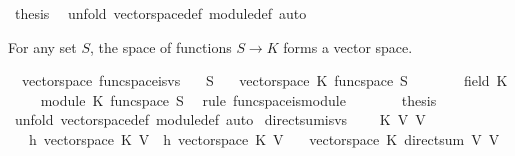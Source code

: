 \begin{isabellebody}
\ {\isacharquery}thesis\ \isamarkupfalse%
\ {\isacharparenleft}unfold\ vectorspace{\isacharunderscore}def\ module{\isacharunderscore}def{\isacharcomma}\ auto{\isacharparenright}\isanewline
{}\isamarkupfalse%
%
\endisatagproof
{\isafoldproof}%
%
\isadelimproof
%
\endisadelimproof
%
\begin{isamarkuptext}%
For any set $S$, the space of functions $S\to K$ forms a vector space.%
\end{isamarkuptext}%
\isamarkuptrue%
\isamarkupfalse%
\ {\isacharparenleft}\ vectorspace{\isacharparenright}\ func{\isacharunderscore}space{\isacharunderscore}is{\isacharunderscore}vs{\isacharcolon}\isanewline
\ \ \ S\isanewline
\ \ \ {\isachardoublequoteopen}vectorspace\ K\ {\isacharparenleft}func{\isacharunderscore}space\ S{\isacharparenright}{\isachardoublequoteclose}\ \isanewline
%
\isadelimproof
%
\endisadelimproof
%
\isatagproof
{}\isamarkupfalse%
\ {\isacharminus}\isanewline
\ \ \isamarkupfalse%
\ {}{\isacharcolon}\ {\isachardoublequoteopen}field\ K{\isachardoublequoteclose}\isacommand{{\isachardot}{\isachardot}}\isamarkupfalse%
\isanewline
\ \ \isamarkupfalse%
\ {}{\isacharcolon}\ {\isachardoublequoteopen}module\ K\ {\isacharparenleft}func{\isacharunderscore}space\ S{\isacharparenright}{\isachardoublequoteclose}\ \isamarkupfalse%
\ {\isacharparenleft}rule\ func{\isacharunderscore}space{\isacharunderscore}is{\isacharunderscore}module{\isacharparenright}\isanewline
\ \ \isamarkupfalse%
\ {}\ {}\ \isamarkupfalse%
\ {\isacharquery}thesis\ \isamarkupfalse%
\ {\isacharparenleft}unfold\ vectorspace{\isacharunderscore}def\ module{\isacharunderscore}def{\isacharcomma}\ auto{\isacharparenright}\isanewline
{}\isamarkupfalse%
%
\endisatagproof
{\isafoldproof}%
%
\isadelimproof
\isanewline
%
\endisadelimproof
\isanewline
\isanewline
{}\isamarkupfalse%
\ direct{\isacharunderscore}sum{\isacharunderscore}is{\isacharunderscore}vs{\isacharcolon}\ \isanewline
\ \ \ K\ V{}\ V{}\isanewline
\ \ \ h{}{\isacharcolon}\ {\isachardoublequoteopen}vectorspace\ K\ V{}{\isachardoublequoteclose}\ \ h{}{\isacharcolon}\ {\isachardoublequoteopen}vectorspace\ K\ V{}{\isachardoublequoteclose}\isanewline
\ \ \ {\isachardoublequoteopen}vectorspace\ K\ {\isacharparenleft}direct{\isacharunderscore}sum\ V{}\ V{}{\isacharparenright}{\isachardoublequoteclose}\isanewline

\end{isabellebody}
